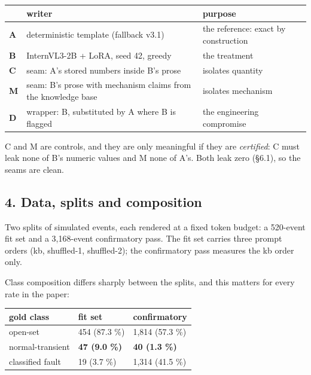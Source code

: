 \documentclass[
  10pt,
]{article}
\begin{document}
\begin{longtable}[]{@{}
  >{\raggedright\arraybackslash}p{}
  >{\raggedright\arraybackslash}p{}
  >{\raggedright\arraybackslash}p{}@{}}
\toprule\noalign{}
\begin{minipage}[b]{\linewidth}\raggedright
\end{minipage} & \begin{minipage}[b]{\linewidth}\raggedright
writer
\end{minipage} & \begin{minipage}[b]{\linewidth}\raggedright
purpose
\end{minipage} \\
\midrule\noalign{}
\endhead
\bottomrule\noalign{}
\endlastfoot
\textbf{A} & deterministic template (fallback v3.1) & the reference:
exact by construction \\
\textbf{B} & InternVL3-2B + LoRA, seed 42, greedy & the treatment \\
\textbf{C} & seam: A's stored numbers inside B's prose & isolates
quantity \\
\textbf{M} & seam: B's prose with mechanism claims from the knowledge
base & isolates mechanism \\
\textbf{D} & wrapper: B, substituted by A where B is flagged & the
engineering compromise \\
\end{longtable}

C and M are controls, and they are only meaningful if they are
\emph{certified}: C must leak none of B's numeric values and M none of
A's. Both leak zero (\S6.1), so the seams are clean.

\subsection{4. Data, splits and
composition}\label{data-splits-and-composition}

Two splits of simulated events, each rendered at a fixed token budget: a
520-event fit set and a 3,168-event confirmatory pass. The fit set
carries three prompt orders (kb, shuffled-1, shuffled-2); the
confirmatory pass measures the kb order only.

Class composition differs sharply between the splits, and this matters
for every rate in the paper:

\begin{longtable}[]{@{}lll@{}}
\toprule\noalign{}
gold class & fit set & confirmatory \\
\midrule\noalign{}
\endhead
\bottomrule\noalign{}
\endlastfoot
open-set & 454 (87.3 \%) & 1,814 (57.3 \%) \\
normal-transient & \textbf{47 (9.0 \%)} & \textbf{40 (1.3 \%)} \\
classified fault & 19 (3.7 \%) & 1,314 (41.5 \%) \\
\end{longtable}
\end{document}

